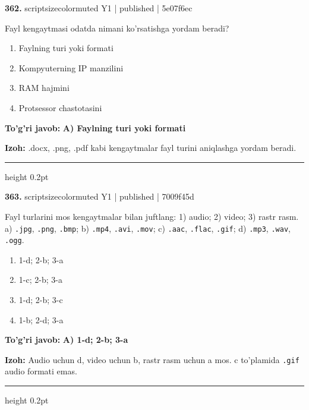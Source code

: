\documentclass[10pt,a4paper]{article}
\begin{document}
{\bfseries\sffamily\color{ink} 362.} {scriptsizecolor{muted} Y1 | published | 5e07f6ec}
\par
Fayl kengaytmasi odatda nimani ko'rsatishga yordam beradi?
\begin{enumerate}[label=\Alph*),leftmargin=9mm]
\item Faylning turi yoki formati
\item Kompyuterning IP manzilini
\item RAM hajmini
\item Protsessor chastotasini
\end{enumerate}
\begin{tcolorbox}[enhanced,breakable,colback=teal!4,colframe=teal!60!black,boxrule=0.45pt,arc=1.2mm,left=2.7mm,right=2.7mm,top=1.8mm,bottom=1.8mm,before skip=2mm,after skip=2mm]
{\bfseries\sffamily\color{teal}To'g'ri javob:} \textbf{A) Faylning turi yoki formati}
\par\smallskip
{\bfseries Izoh:} .docx, .png, .pdf kabi kengaytmalar fayl turini aniqlashga yordam beradi.
\end{tcolorbox}
\vspace{2mm}\hrule height 0.2pt\vspace{3mm}

{\bfseries\sffamily\color{ink} 363.} {scriptsizecolor{muted} Y1 | published | 7009f45d}
\par
Fayl turlarini mos kengaytmalar bilan juftlang: 1) audio; 2) video; 3) rastr rasm. a) \texttt{.jpg}, \texttt{.png}, \texttt{.bmp}; b) \texttt{.mp4}, \texttt{.avi}, \texttt{.mov}; c) \texttt{.aac}, \texttt{.flac}, \texttt{.gif}; d) \texttt{.mp3}, \texttt{.wav}, \texttt{.ogg}.
\begin{enumerate}[label=\Alph*),leftmargin=9mm]
\item 1-d; 2-b; 3-a
\item 1-c; 2-b; 3-a
\item 1-d; 2-b; 3-c
\item 1-b; 2-d; 3-a
\end{enumerate}
\begin{tcolorbox}[enhanced,breakable,colback=teal!4,colframe=teal!60!black,boxrule=0.45pt,arc=1.2mm,left=2.7mm,right=2.7mm,top=1.8mm,bottom=1.8mm,before skip=2mm,after skip=2mm]
{\bfseries\sffamily\color{teal}To'g'ri javob:} \textbf{A) 1-d; 2-b; 3-a}
\par\smallskip
{\bfseries Izoh:} Audio uchun d, video uchun b, rastr rasm uchun a mos. c to'plamida \texttt{.gif} audio formati emas.
\end{tcolorbox}
\vspace{2mm}\hrule height 0.2pt\vspace{3mm}
\end{document}
